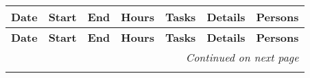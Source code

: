 \renewcommand{\arraystretch}{1.3} %
\footnotesize
\begin{longtable}{@{}p{1.8cm} p{1.2cm} p{1.2cm} p{1.2cm} p{2cm} p{4.5cm} p{2cm}@{}}
    \toprule
    \textbf{Date} & \textbf{Start} & \textbf{End} & \textbf{Hours} & \textbf{Tasks} & \textbf{Details} & \textbf{Persons} \\
    \midrule
    \endfirsthead

    \toprule
    \textbf{Date} & \textbf{Start} & \textbf{End} & \textbf{Hours} & \textbf{Tasks} & \textbf{Details} & \textbf{Persons} \\
    \midrule
    \endhead

    \midrule
    \multicolumn{7}{r}{\textit{Continued on next page}} \\
    \midrule
    \endfoot

    \bottomrule
    \endlastfoot


\end{longtable}
